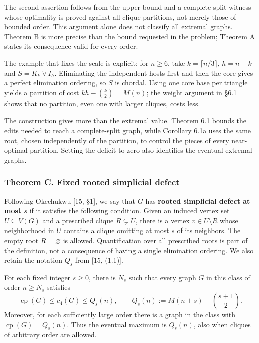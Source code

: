 \documentclass[english,11pt,a4paper]{article}
\begin{document}
The second assertion follows from the upper bound and a complete-split witness whose optimality is proved against all clique partitions, not merely those of bounded order. This argument alone does not classify all extremal graphs. Theorem B is more precise than the bound requested in the problem; Theorem A states its consequence valid for every order.

The example that fixes the scale is explicit: for \(n\ge6\), take \(k=\lceil n/3\rceil\), \(h=n-k\) and \(S=K_k\vee I_h\). Eliminating the independent hosts first and then the core gives a perfect elimination ordering, so \(S\) is chordal. Using one core base per triangle yields a partition of cost \(kh-\binom k2=M(n)\); the weight argument in §6.1 shows that no partition, even one with larger cliques, costs less.

The construction gives more than the extremal value. Theorem 6.1 bounds the edits needed to reach a complete-split graph, while Corollary 6.1a uses the same root, chosen independently of the partition, to control the pieces of every near-optimal partition. Setting the deficit to zero also identifies the eventual extremal graphs.

\subsubsection{Theorem C. Fixed rooted simplicial defect}\label{theorem-c.-fixed-rooted-simplicial-defect}

Following Okechukwu {[}15, §1{]}, we say that \(G\) has \textbf{rooted simplicial defect at most \(s\)} if it satisfies the following condition. Given an induced vertex set \(U\subseteq V(G)\) and a prescribed clique \(R\subsetneq U\), there is a vertex \(v\in U\setminus R\) whose neighborhood in \(U\) contains a clique omitting at most \(s\) of its neighbors. The empty root \(R=\varnothing\) is allowed. Quantification over all prescribed roots is part of the definition, not a consequence of having a single elimination ordering. We also retain the notation \(Q_s\) from {[}15, (1.1){]}.

For each fixed integer \(s\ge0\), there is \(N_s\) such that every graph \(G\) in this class of order \(n\ge N_s\) satisfies \[
\operatorname{cp}(G)\le c_4(G)\le Q_s(n),
\qquad
Q_s(n):=M(n+s)-\binom{s+1}{2}.
\tag{C}
\] Moreover, for each sufficiently large order there is a graph in the class with \(\operatorname{cp}(G)=Q_s(n)\). Thus the eventual maximum is \(Q_s(n)\), also when cliques of arbitrary order are allowed.
\end{document}
